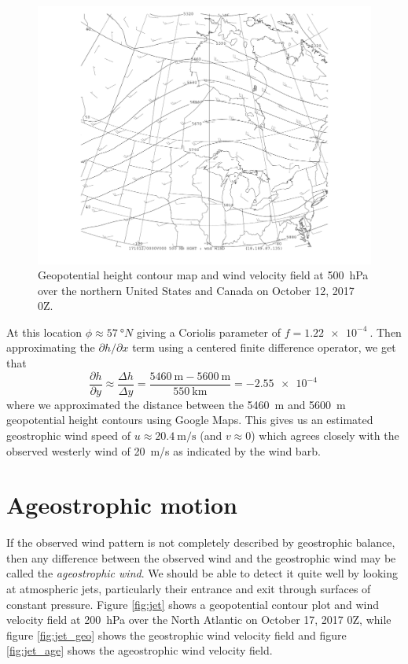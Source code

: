 \documentclass[11pt]{article}
\newcommand\p[2]{\frac{\partial #1}{\partial #2}}
\begin{document}
\begin{figure}[h!]
	\centering
	\includegraphics[trim={3.5cm 1cm 3.5cm 0},clip,width=\textwidth]{500hPa_hght_wind_hudson_bay}
	\caption{Geopotential height contour map and wind velocity field at \SI{500}{\hecto\Pa} over the northern United States and Canada on October 12, 2017 0Z.}
	\label{fig:hudson}
\end{figure}

At this location $\phi \approx \SI{57}{\degree N}$ giving a Coriolis parameter of $f = \SI{1.22e-4}{}$. Then approximating the $\partial h/\partial x$ term using a centered finite difference operator, we get that
\begin{equation*}
	\p{h}{y} \approx \frac{\Delta h}{\Delta y} = \frac{\SI{5460}{\m} - \SI{5600}{\m}}{\SI{550}{\km}} = \SI{-2.55e-4}{}
\end{equation*}
where we approximated the distance between the \SI{5460}{\m} and \SI{5600}{\m} geopotential height contours using Google Maps. This gives us an estimated geostrophic wind speed of $u \approx \SI{20.4}{\m/\s}$ (and $v \approx 0$) which agrees closely with the observed westerly wind of \SI{20}{\m/\s} as indicated by the wind barb.

\section{Ageostrophic motion}
If the observed wind pattern is not completely described by geostrophic balance, then any difference between the observed wind and the geostrophic wind may be called the \emph{ageostrophic wind}. We should be able to detect it quite well by looking at atmospheric jets, particularly their entrance and exit through surfaces of constant pressure. Figure \ref{fig:jet} shows a geopotential contour plot and wind velocity field at \SI{200}{\hecto\Pa} over the North Atlantic on October 17, 2017 0Z, while figure \ref{fig:jet_geo} shows the geostrophic wind velocity field and figure \ref{fig:jet_age} shows the ageostrophic wind velocity field.
\end{document}
